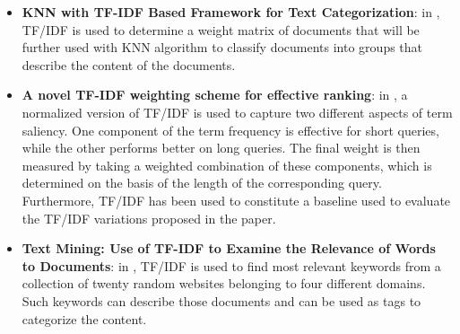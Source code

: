 \documentclass[\main/main.tex]{subfiles}
\begin{document}
\begin{itemize}
    \item \textbf{KNN with TF-IDF Based Framework for Text Categorization}: in \cite{Trstenjak2014KNNWT}, TF/IDF is used to determine a weight matrix of documents that will be further used with KNN algorithm to classify documents into groups that describe the content of the documents.
    \item \textbf{A novel TF-IDF weighting scheme for effective ranking}: in \cite{Paik2013ANT}, a normalized version of TF/IDF is used to capture two different aspects of term saliency. One component of the term frequency is effective for short queries, while the other performs better on long queries. The final weight is then measured by taking a weighted combination of these components, which is determined on the basis of the length of the corresponding query. Furthermore, TF/IDF has been used to constitute a baseline used to evaluate the TF/IDF variations proposed in the paper.
    \item \textbf{Text Mining: Use of TF-IDF to Examine the Relevance of Words to Documents}: in \cite{Qaiser2018TextMU}, TF/IDF is used to find most relevant keywords from a collection of twenty random websites belonging to four different domains. Such keywords can describe those documents and can be used as tags to categorize the content.
\end{itemize}
\end{document}
